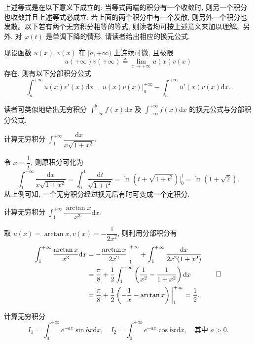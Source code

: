 \begin{remark}\label{remark:ma-8-source-10}
上述等式是在以下意义下成立的: 当等式两端的积分有一个收敛时, 则另一个积分也收敛并且上述等式必成立; 若上面的两个积分中有一个发散, 则另外一个积分也发散。以下若有两个无穷积分相等的等式, 则读者均可按上述意义来加以理解。另外, 对 $\varphi(t)$ 是单调下降的情形, 请读者给出相应的换元公式.
\end{remark}

现设函数 $u(x),v(x)$ 在 $[a,+\infty)$ 上连续可微, 且极限
\[
  u(+\infty)v(+\infty)\triangleq \lim_{x\to+\infty}u(x)v(x)
\]
存在, 则有以下分部积分公式
\[
  \int_a^{+\infty}u(x)v'(x)\mathrm dx
  =
  u(x)v(x)\big|_a^{+\infty}
  -
  \int_a^{+\infty}u'(x)v(x)\mathrm dx.
\]

读者可类似地给出无穷积分 $\int_{-\infty}^b f(x)\mathrm dx$ 及 $\int_{-\infty}^{+\infty}f(x)\mathrm dx$ 的换元公式与分部积分公式.

\begin{example}\label{example:ma-8-1-4}
计算无穷积分 $\int_1^{+\infty}\dfrac{\mathrm dx}{x\sqrt{1+x^2}}$.
\end{example}


\begin{solve}
令 $x=\dfrac1t$, 则原积分可化为
\[
  \int_1^{+\infty}\frac{\mathrm dx}{x\sqrt{1+x^2}}
  =
  \int_0^1\frac{\mathrm dt}{\sqrt{1+t^2}}
  =
  \ln(t+\sqrt{1+t^2})\big|_0^1
  =
  \ln(1+\sqrt2).
\]
从上例可知, 一个无穷积分经过换元后有时可变成一个定积分.
\end{solve}


\begin{example}\label{example:ma-8-1-5}
计算无穷积分 $\int_1^{+\infty}\dfrac{\arctan x}{x^3}\mathrm dx$.
\end{example}


\begin{solve}
取 $u(x)=\arctan x,v(x)=-\dfrac1{2x^2}$, 则利用分部积分有
\[
\begin{aligned}
  \int_1^{+\infty}\frac{\arctan x}{x^3}\mathrm dx
  &=
  -\frac{\arctan x}{2x^2}\bigg|_1^{+\infty}
  +
  \int_1^{+\infty}\frac{\mathrm dx}{2x^2(1+x^2)}\\
  &=
  \frac{\pi}{8}
  +
  \frac12\int_1^{+\infty}\left(\frac1{x^2}-\frac1{1+x^2}\right)\mathrm dx\\
  &=
  \frac{\pi}{8}
  +
  \frac12\left(-\frac1x-\arctan x\right)\bigg|_1^{+\infty}
  =
  \frac12.
\end{aligned}
\qedhere
\]
\end{solve}


\begin{example}\label{example:ma-8-1-6}
计算无穷积分
\[
  I_1=\int_0^{+\infty}e^{-ax}\sin bx\mathrm dx,\quad
  I_2=\int_0^{+\infty}e^{-ax}\cos bx\mathrm dx,\quad
  \text{其中 }a>0.
\]
\end{example}


